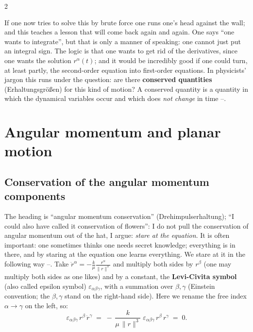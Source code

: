 \begin{paracol}{2}
\begin{intuition}\label{int:tb-conserved}
If one now tries to solve this by brute force one runs one's head against the wall; and this teaches a lesson that will come back again and again. One says ``one wants to integrate'', but that is only a manner of speaking: one cannot just put an integral sign. The logic is that one wants to get rid of the derivatives, since one wants the solution $r^\alpha(t)$;
and it would be incredibly good if one could turn, at least partly, the second-order equation into first-order equations. In physicists' jargon this runs under the question: are there \textbf{conserved quantities} (Erhaltungsgr\"o{\ss}en) for this kind of motion? A conserved quantity is a quantity in which the dynamical variables occur and which does \emph{not change} in time --.
\end{intuition}

\section{Angular momentum and planar motion}\label{sec:tb-L}

\subsection{Conservation of the angular momentum components}\label{ssec:tb-Lcons}

The heading is ``angular momentum conservation'' (Drehimpulserhaltung); ``I could also have called it conservation of flowers'': I do not pull the conservation of angular momentum out of the hat, I argue: \emph{stare at the equation}. It is often important: one sometimes thinks one needs secret knowledge; everything is in there, and by staring at the equation one learns everything. We stare at it in the following way --.
Take $\ddot r^\alpha=-\frac{k}{\mu}\frac{r^\alpha}{\|r\|^3}$ and multiply both sides by $r^\beta$ (one may multiply both sides as one likes) and by a constant, the \textbf{Levi-Civita symbol} (also called epsilon symbol) $\varepsilon_{\alpha\beta\gamma}$, with a summation over $\beta,\gamma$ (Einstein convention; the $\beta,\gamma$ stand on the right-hand side). Here we rename the free index $\alpha\to\gamma$ on the left, so:
\begin{equation}\label{eq:tb-eps}
  \varepsilon_{\alpha\beta\gamma}\,r^\beta\,\ddot r^\gamma\;=\;-\,\frac{k}{\mu\,\|r\|^3}\;\varepsilon_{\alpha\beta\gamma}\,r^\beta\,r^\gamma\;=\;0 .
\end{equation}


\end{paracol}
